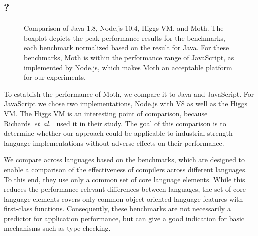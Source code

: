 \subsection{\AWFY?}
\label{sec:baseline-perf}


\begin{figure}
  \centering
	\AwfyBaseline{}
	\caption{Comparison of Java 1.8, Node.js 10.4, Higgs VM, and Moth.
  The boxplot depicts the peak-performance results for the \AWFY benchmarks,
  each benchmark normalized based on the result for Java.
  For these benchmarks, Moth is within the performance range
  of JavaScript, as implemented by Node.js,
  which makes Moth an acceptable platform for our experiments.}
	\label{fig:awfy-baseline}
\end{figure}

To establish the performance of Moth,
we compare it to Java and JavaScript.
For JavaScript we chose two implementations,
Node.js with V8 as well as the Higgs VM.
The Higgs VM is an interesting point of comparison,
because Richards~\textit{et~al.}~\cite{Richards2017} used it in their study.
The goal of this comparison is to determine whether our approach
could be applicable to industrial strength language implementations
without adverse effects on their performance. 

We compare across languages based on the \AWFY benchmarks\citep{Marr2016},
which are designed to enable a comparison
of the effectiveness of compilers across different languages.
To this end, they use only a common set of core language elements.
While this reduces the performance-relevant differences between languages,
the set of core language elements covers only common object-oriented language
features with first-class functions.
Consequently, these benchmarks are not necessarily a predictor
for application performance,
but can give a good indication for basic mechanisms such as type checking.

